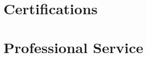 \documentclass[margin,centered]{resVoyles}
\begin{document}
\begin{resume}
% 




\section{\sc Certifications} 








\section{\sc Professional Service} 





% 


% 






\end{resume}
\end{document}
